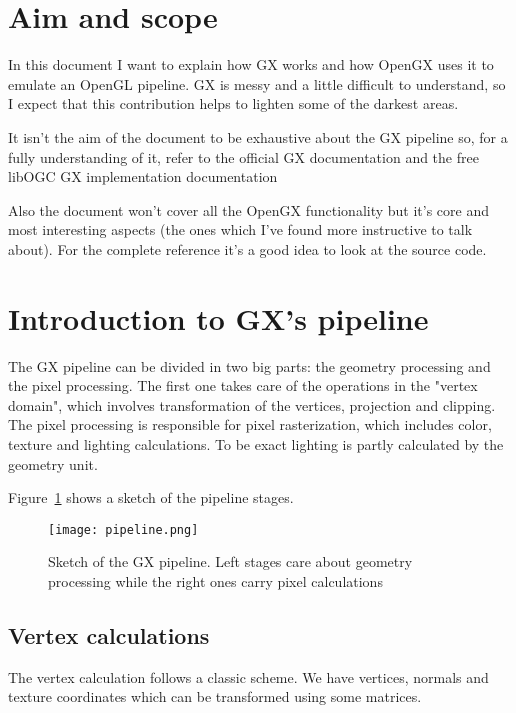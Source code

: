 \documentclass[12pt]{article}
\begin{document}
\section{Aim and scope}

In this document I want to explain how GX works and how OpenGX uses it to emulate an OpenGL pipeline. GX is messy and a little difficult to understand, so I expect that this contribution helps to lighten some of the darkest areas.

It isn't the aim of the document to be exhaustive about the GX pipeline so, for a fully understanding of it, refer to the official GX documentation \cite{nintendogx} and the free libOGC GX implementation documentation \cite{libogc_gx_docs}

Also the document won't cover all the OpenGX functionality but it's core and most interesting aspects (the ones which I've found more instructive to talk about). For the complete reference it's a good idea to look at the source code.

\section{Introduction to GX's pipeline}

The GX pipeline can be divided in two big parts: the geometry processing and the pixel processing. The first one takes care of the operations in the "vertex domain", which involves transformation of the vertices, projection and clipping. The pixel processing is responsible for pixel rasterization, which includes color, texture and lighting calculations. To be exact lighting is partly calculated by the geometry unit.

Figure~\ref{fig:gx_full_pipeline} shows a sketch of the pipeline stages.

\begin{figure}[ht]
\centering
\texttt{[image: pipeline.png]}
\caption{Sketch of the GX pipeline. Left stages care about geometry processing while the right ones carry pixel calculations}
\label{fig:gx_full_pipeline}
\end{figure}


\subsection{Vertex calculations}

The vertex calculation follows a classic scheme. We have vertices, normals and texture coordinates which can be transformed using some matrices.
\end{document}
